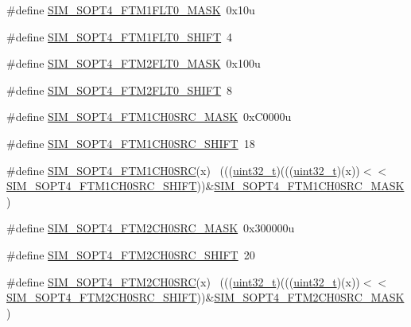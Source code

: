 \begin{DoxyCompactItemize}
\#define \hyperlink{group___s_i_m___register___masks_ga605f729e3f4faddc18e957c077adf61a}{S\+I\+M\+\_\+\+S\+O\+P\+T4\+\_\+\+F\+T\+M1\+F\+L\+T0\+\_\+\+M\+A\+SK}~0x10u
\item 
\#define \hyperlink{group___s_i_m___register___masks_ga9fb8861affd661f64719260a43a87ec6}{S\+I\+M\+\_\+\+S\+O\+P\+T4\+\_\+\+F\+T\+M1\+F\+L\+T0\+\_\+\+S\+H\+I\+FT}~4
\item 
\#define \hyperlink{group___s_i_m___register___masks_ga4f61f56a63a5d239be393708c17cf82c}{S\+I\+M\+\_\+\+S\+O\+P\+T4\+\_\+\+F\+T\+M2\+F\+L\+T0\+\_\+\+M\+A\+SK}~0x100u
\item 
\#define \hyperlink{group___s_i_m___register___masks_ga15275ae91c6efbf697f472b940369401}{S\+I\+M\+\_\+\+S\+O\+P\+T4\+\_\+\+F\+T\+M2\+F\+L\+T0\+\_\+\+S\+H\+I\+FT}~8
\item 
\#define \hyperlink{group___s_i_m___register___masks_ga8be459723f070708becab666dc6abc47}{S\+I\+M\+\_\+\+S\+O\+P\+T4\+\_\+\+F\+T\+M1\+C\+H0\+S\+R\+C\+\_\+\+M\+A\+SK}~0x\+C0000u
\item 
\#define \hyperlink{group___s_i_m___register___masks_gaee4e8fb1805bded49220a407c1620345}{S\+I\+M\+\_\+\+S\+O\+P\+T4\+\_\+\+F\+T\+M1\+C\+H0\+S\+R\+C\+\_\+\+S\+H\+I\+FT}~18
\item 
\#define \hyperlink{group___s_i_m___register___masks_gadce9eb5cf4628062440e4c30611c8681}{S\+I\+M\+\_\+\+S\+O\+P\+T4\+\_\+\+F\+T\+M1\+C\+H0\+S\+RC}(x)                                ~(((\hyperlink{_p_e___types_8h_a33594304e786b158f3fb30289278f5af}{uint32\+\_\+t})(((\hyperlink{_p_e___types_8h_a33594304e786b158f3fb30289278f5af}{uint32\+\_\+t})(x))$<$$<$\hyperlink{group___s_i_m___register___masks_gaee4e8fb1805bded49220a407c1620345}{S\+I\+M\+\_\+\+S\+O\+P\+T4\+\_\+\+F\+T\+M1\+C\+H0\+S\+R\+C\+\_\+\+S\+H\+I\+FT}))\&\hyperlink{group___s_i_m___register___masks_ga8be459723f070708becab666dc6abc47}{S\+I\+M\+\_\+\+S\+O\+P\+T4\+\_\+\+F\+T\+M1\+C\+H0\+S\+R\+C\+\_\+\+M\+A\+SK})
\item 
\#define \hyperlink{group___s_i_m___register___masks_ga0dcacc22852e0ee0a7a853a51b422b70}{S\+I\+M\+\_\+\+S\+O\+P\+T4\+\_\+\+F\+T\+M2\+C\+H0\+S\+R\+C\+\_\+\+M\+A\+SK}~0x300000u
\item 
\#define \hyperlink{group___s_i_m___register___masks_ga04d4aa6612f4d2df7d9e0e85f15f6dd6}{S\+I\+M\+\_\+\+S\+O\+P\+T4\+\_\+\+F\+T\+M2\+C\+H0\+S\+R\+C\+\_\+\+S\+H\+I\+FT}~20
\item 
\#define \hyperlink{group___s_i_m___register___masks_ga05f9da2ddf9e9aa2509b88a964cb91f6}{S\+I\+M\+\_\+\+S\+O\+P\+T4\+\_\+\+F\+T\+M2\+C\+H0\+S\+RC}(x)                                ~(((\hyperlink{_p_e___types_8h_a33594304e786b158f3fb30289278f5af}{uint32\+\_\+t})(((\hyperlink{_p_e___types_8h_a33594304e786b158f3fb30289278f5af}{uint32\+\_\+t})(x))$<$$<$\hyperlink{group___s_i_m___register___masks_ga04d4aa6612f4d2df7d9e0e85f15f6dd6}{S\+I\+M\+\_\+\+S\+O\+P\+T4\+\_\+\+F\+T\+M2\+C\+H0\+S\+R\+C\+\_\+\+S\+H\+I\+FT}))\&\hyperlink{group___s_i_m___register___masks_ga0dcacc22852e0ee0a7a853a51b422b70}{S\+I\+M\+\_\+\+S\+O\+P\+T4\+\_\+\+F\+T\+M2\+C\+H0\+S\+R\+C\+\_\+\+M\+A\+SK})

\end{DoxyCompactItemize}
